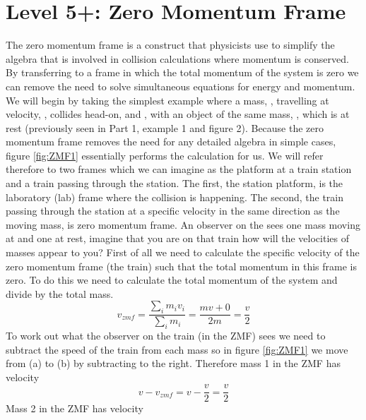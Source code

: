 \section{Level 5+: Zero Momentum Frame}
The zero momentum frame is a construct that physicists use to simplify the algebra that is involved in collision calculations where momentum is conserved.  By transferring to a frame in which the total momentum of the system is zero we can remove the need to solve simultaneous equations for energy and momentum.
{\noindent We will begin by taking the simplest example where a mass, , travelling at velocity, , collides head-on, and , with an object of the same mass, , which is at rest (previously seen in  Part 1, example 1 and figure 2).\nll
Because the zero momentum frame removes the need for any detailed algebra in simple cases, figure \ref{fig:ZMF1} essentially performs the calculation for us.  We will refer therefore to two frames which we can imagine as the platform at a train station and a train passing through the station.
The first, the station platform, is the laboratory (lab) frame where the collision is happening.  The second, the train passing through the station at a specific velocity in the same direction as the moving mass, is zero momentum frame.  An observer on the  sees one mass moving at  and one at rest,  imagine that you are on that train how will the velocities of masses appear to you? \nll
First of all we need to calculate the specific velocity of the zero momentum frame (the train) such that the total momentum in this frame is zero.  To do this we need to calculate the total momentum of the system and divide by the total mass.
\begin{equation}
v_{zmf}=\frac{\sum_i{m_i v_i}}{\sum_i m_i} = \frac{mv+0}{2m} = \frac{v}{2}
\end{equation}
\noindent To work out what the observer on the train (in the ZMF) sees we need to subtract the speed of the train from each mass so in figure \ref{fig:ZMF1} we move from (a) to (b) by subtracting  to the right.  Therefore mass 1 in the ZMF has velocity
\begin{equation}
v-v_{zmf}=v-\frac{v}{2}=\frac{v}{2}
\end{equation}
Mass 2 in the ZMF has velocity
\begin{equation}

\end{equation}}
